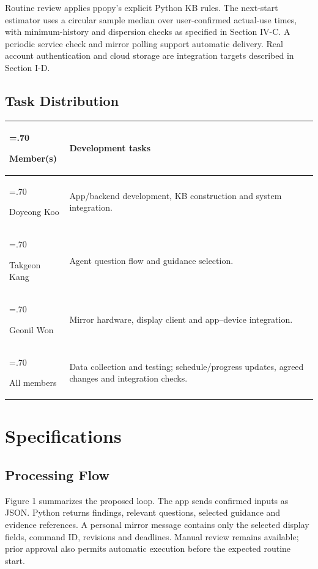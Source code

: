 \documentclass[conference,letterpaper]{IEEEtran}
\begin{document}
Routine review applies ppopy's explicit Python KB rules. The next-start estimator uses a circular sample median over user-confirmed actual-use times, with minimum-history and dispersion checks as specified in Section IV-C. A periodic service check and mirror polling support automatic delivery. Real account authentication and cloud storage are integration targets described in Section I-D.

\subsection{Task Distribution}

{\centering\footnotesize
\renewcommand{\arraystretch}{1.12}\setlength{\tabcolsep}{3pt}
\begin{tabularx}{\columnwidth}{@{}>{\hsize=.70\hsize\raggedright\arraybackslash}X>{\hsize=1.30\hsize\raggedright\arraybackslash}X@{}}\toprule
\textbf{Member(s)} & \textbf{Development tasks}\\\midrule
Doyeong Koo & App/backend development, KB construction and system integration.\\
Takgeon Kang & Agent question flow and guidance selection.\\
Geonil Won & Mirror hardware, display client and app--device integration.\\
All members & Data collection and testing; schedule/progress updates, agreed changes and integration checks.\\
\bottomrule
\end{tabularx}
}

\section{Specifications}

\subsection{Processing Flow}

Figure 1 summarizes the proposed loop. The app sends confirmed inputs as JSON. Python returns findings, relevant questions, selected guidance and evidence references. A personal mirror message contains only the selected display fields, command ID, revisions and deadlines. Manual review remains available; prior approval also permits automatic execution before the expected routine start.
\end{document}
